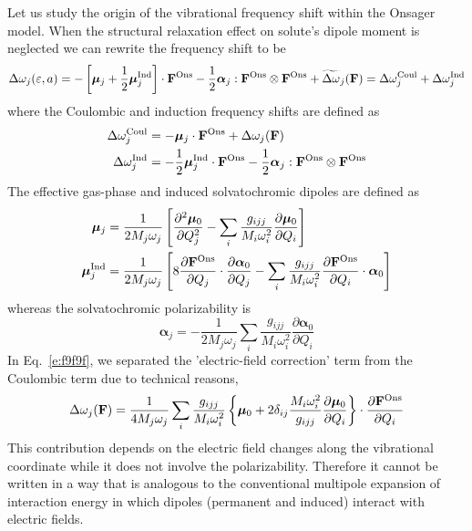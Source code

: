 \documentclass[a4paper,titlepage,twoside,fleqn,12pt]{book}
\newcommand{\BM}[1]{\bm{#1}}
\newcommand{\fderiv}[2]{\ensuremath{
\frac{\partial #1}{\partial #2}}}
\newcommand{\sderiv}[2]{\ensuremath{
\frac{\partial^2 #1}{\partial #2^2}
}}
\begin{document}
\begin{refsection}
Let us study the origin of the vibrational frequency shift
within the Onsager model. 
When the structural relaxation effect on solute's dipole moment
is neglected we can rewrite the frequency shift to be
%
\begin{equation} \label{e:f9f9f}
 \Delta\omega_j(\varepsilon, a) = 
- \left[ {\BM \mu}_j + \frac{1}{2} {\BM \mu}_j^{\rm Ind} \right] \cdot {\bf F}^{\rm Ons} 
- \frac{1}{2} {\BM \alpha}_j : {\bf F}^{\rm Ons} \otimes {\bf F}^{\rm Ons} 
+ \widetilde{\Delta\omega}_j({\bf F})
 = \Delta\omega_j^{\rm Coul} + \Delta\omega_j^{\rm Ind}
\end{equation}
%
where the Coulombic and induction frequency shifts 
are defined as
%
\begin{subequations}
 \begin{align}
   \Delta\omega_j^{\rm Coul}             &= - {\BM \mu}_j \cdot {\bf F}^{\rm Ons} + \Delta\omega_j({\bf F})\\
   \Delta\omega_j^{\rm Ind}              &= - \frac{1}{2} {\BM \mu}_j^{\rm Ind} \cdot {\bf F}^{\rm Ons} 
       - \frac{1}{2} {\BM \alpha}_j : {\bf F}^{\rm Ons} \otimes {\bf F}^{\rm Ons} 
 \end{align}
\end{subequations}
%
The effective gas\hyp{}phase and induced solvatochromic dipoles
are defined as
%
\begin{subequations}
 \begin{align}
   {\BM \mu}_j &= \frac{1}{2M_j\omega_j}
\left[  \sderiv{{\BM\mu}_0}{Q_j}
- \sum_i \frac{g_{ijj}}{M_i\omega_i^2} \fderiv{{\BM\mu}_0}{Q_i}
\right] \\
   {\BM \mu}_j^{\rm Ind} &= \frac{1}{2M_j\omega_j} 
\left[ 8 \fderiv{{\bf F}^{\rm Ons}}{Q_j} \cdot \fderiv{{\BM\alpha}_0}{Q_j} - 
   \sum_i \frac{g_{ijj}}{M_i\omega_i^2} \fderiv{{\bf F}^{\rm Ons}}{Q_i} \cdot {\BM\alpha}_0
\right]
 \end{align}
\end{subequations}
%
whereas the solvatochromic polarizability is
%
\begin{equation} 
  {\BM \alpha}_j = - \frac{1}{2M_j\omega_j} 
   \sum_i \frac{g_{ijj}}{M_i\omega_i^2} \fderiv{{\BM\alpha}_0}{Q_i}
\end{equation}
%
In Eq.~\eqref{e:f9f9f}, we separated the 'electric-field correction'
term from the Coulombic term due to technical reasons,
%
\begin{equation} 
\Delta\omega_j({\bf F}) = \frac{1}{4M_j\omega_j}
\sum_i \frac{g_{ijj}}{M_i\omega_i^2} \left\{ {\BM\mu}_0 + 
2\delta_{ij}\frac{M_i\omega_i^2}{g_{ijj}}\fderiv{{\BM\mu}_0}{Q_i}\right\} \cdot \fderiv{{\bf F}^{\rm Ons}}{Q_i}
\end{equation}
%
This contribution depends on the electric field changes along the vibrational
coordinate while it does not involve the polarizability. Therefore
it cannot be written in a way that is analogous
to the conventional multipole expansion of interaction energy 
in which dipoles (permanent and induced) interact with electric fields.


\end{refsection}
\end{document}
